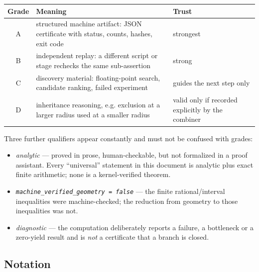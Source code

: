 \begin{center}
\footnotesize
\begin{tabular}{@{}c>{\raggedright\arraybackslash}p{}>{\raggedright\arraybackslash}p{}@{}}
\toprule
Grade & Meaning & Trust \\
\midrule
A & structured machine artifact: JSON certificate with status, counts, hashes, exit code &
strongest \\
B & independent replay: a different script or stage rechecks the same sub-assertion & strong \\
C & discovery material: floating-point search, candidate ranking, failed experiment &
guides the next step only \\
D & inheritance reasoning, e.g. exclusion at a larger radius used at a smaller radius &
valid only if recorded explicitly by the combiner \\
\bottomrule
\end{tabular}
\end{center}

Three further qualifiers appear constantly and must not be confused with grades:

\begin{itemize}[leftmargin=1.4em,itemsep=2pt]
\item \emph{analytic} --- proved in prose, human-checkable, but not formalized in a proof
assistant. Every ``universal'' statement in this document is analytic plus exact finite arithmetic;
none is a kernel-verified theorem.
\item \emph{\texttt{machine\_\allowbreak{}verified\_\allowbreak{}geometry = false}} --- the finite rational/interval
inequalities were machine-checked; the reduction from geometry to those inequalities was not.
\item \emph{diagnostic} --- the computation deliberately reports a failure, a bottleneck or a
zero-yield result and is \emph{not} a certificate that a branch is closed.
\end{itemize}

\subsection*{Notation}

